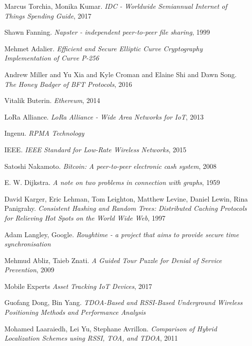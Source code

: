 \documentclass[10pt, nonatbib, nocopyrightspace, reprint]{sigplanconf}
\begin{document}
\begin{thebibliography}{10}
\softraggedright

    Marcus Torchia, Monika Kumar.
    \emph{IDC - Worldwide Semiannual Internet of Things Spending Guide}, 2017

    Shawn Fanning.
    \emph{Napster - independent peer-to-peer file sharing}, 1999

    Mehmet Adalier.
    \emph{Efficient and Secure Elliptic Curve Cryptography Implementation of Curve P-256}

    Andrew Miller and Yu Xia and Kyle Croman and Elaine Shi and Dawn Song.
    \emph{The Honey Badger of BFT Protocols}, 2016

    Vitalik Buterin.
    \emph{Ethereum}, 2014

    LoRa Alliance.
    \emph{LoRa Alliance - Wide Area Networks for IoT}, 2013

    Ingenu.
    \emph{RPMA Technology}

    IEEE.
    \emph{IEEE Standard for Low-Rate Wireless Networks}, 2015

    Satoshi Nakamoto.
    \emph{Bitcoin: A peer-to-peer electronic cash system}, 2008

    E. W. Dijkstra.
    \emph{A note on two problems in connection with graphs}, 1959

    David Karger, Eric Lehman, Tom Leighton, Matthew Levine, Daniel Lewin, Rina Panigrahy.
    \emph{Consistent Hashing and Random Trees: Distributed Caching Protocols for Relieving Hot Spots on the World Wide Web}, 1997

    Adam Langley, Google.
    \emph{Roughtime - a project that aims to provide secure time synchronisation}

    Mehmud Abliz, Taieb Znati.
    \emph{A Guided Tour Puzzle for Denial of Service Prevention}, 2009

    Mobile Experts
    \emph{Asset Tracking IoT Devices}, 2017

    Guofang Dong, Bin Yang.
    \emph{TDOA-Based and RSSI-Based Underground Wireless Positioning Methods and Performance Analysis}

    Mohamed Laaraiedh, Lei Yu, Stephane Avrillon.
    \emph{Comparison of Hybrid Localization Schemes using RSSI, TOA, and TDOA}, 2011


\end{thebibliography}
\end{document}
